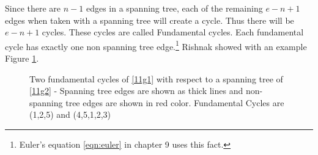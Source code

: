 Since there are $n-1$ edges in a spanning tree, each of the remaining $e-n+1$ edges when taken with a spanning tree will create a cycle. Thus there will be $e-n+1$ cycles. These cycles are called Fundamental cycles. Each fundamental cycle has exactly one non spanning tree edge.\footnote{Euler's equation \ref{eqn:euler} in chapter 9 uses this fact.} Rishnak showed with an example Figure \ref{11g4}.

\begin{figure}
\begin{center}
\caption{ Two fundamental cycles of \ref{11g1} with respect to a spanning tree of \ref{11g2} - Spanning tree edges are shown as thick lines and non-spanning tree edges are shown in red color. Fundamental Cycles are (1,2,5) and (4,5,1,2,3)}\label{11g4}
\end{center}
\end{figure}

